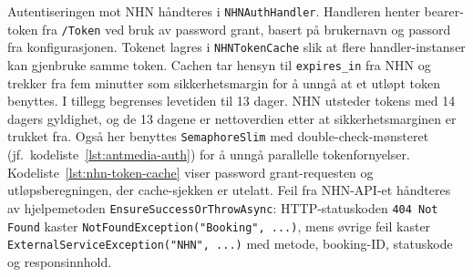
Autentiseringen mot NHN håndteres i \texttt{NHNAuthHandler}. Handleren henter bearer-token fra \texttt{/Token} ved bruk av password grant, basert på brukernavn og passord fra konfigurasjonen. Tokenet lagres i \texttt{NHNTokenCache} slik at flere handler-instanser kan gjenbruke samme token. Cachen tar hensyn til \texttt{expires\_in} fra NHN og trekker fra fem minutter som sikkerhetsmargin for å unngå at et utløpt token benyttes. I tillegg begrenses levetiden til 13 dager. NHN utsteder tokens med 14 dagers gyldighet, og de 13 dagene er nettoverdien etter at sikkerhetsmarginen er trukket fra. Også her benyttes \texttt{SemaphoreSlim} med double-check-mønsteret (jf.\ kodeliste~\ref{lst:antmedia-auth}) for å unngå parallelle tokenfornyelser. Kodeliste~\ref{lst:nhn-token-cache} viser password grant-requesten og utløpsberegningen, der cache-sjekken er utelatt. Feil fra NHN-API-et håndteres av hjelpemetoden \texttt{EnsureSuccessOrThrowAsync}: HTTP-statuskoden \texttt{404 Not Found} kaster \texttt{NotFoundException("Booking", ...)}, mens øvrige feil kaster \texttt{ExternalServiceException("NHN", ...)} med metode, booking-ID, statuskode og responsinnhold.

